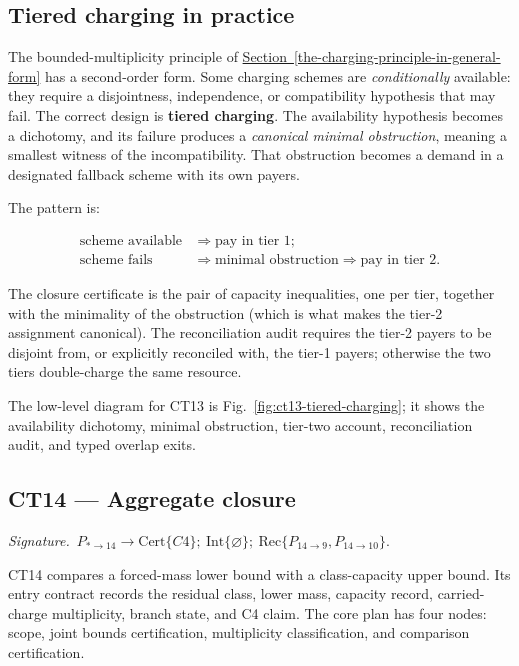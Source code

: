 \documentclass[
  11pt,
]{article}
\theoremstyle{definition}
\newcommand{\secref}[1]{\hyperref[#1]{Section~\ref*{#1}}}
\newcommand{\ctsignature}[1]{\par\noindent\emph{Signature.}\ #1\par\medskip}
\newcommand{\ctcert}[1]{\mathrm{Cert}\{#1\}}
\newcommand{\ctint}[1]{\mathrm{Int}\{#1\}}
\newcommand{\ctrec}[1]{\mathrm{Rec}\{#1\}}
\newcommand{\ctnone}{\varnothing}
\begin{document}
\FloatBarrier


\subsection*{Tiered charging in practice}

The bounded-multiplicity principle of \secref{the-charging-principle-in-general-form} has a second-order
form. Some charging schemes are \emph{conditionally} available: they
require a disjointness, independence, or compatibility hypothesis that
may fail. The correct design is \textbf{tiered charging}. The
availability hypothesis becomes a dichotomy, and its failure produces a
\emph{canonical minimal obstruction}, meaning a smallest witness of the
incompatibility. That obstruction becomes a demand in a designated
fallback scheme with its own payers.

The pattern is:

\[
\begin{aligned}
\text{scheme available} &\Rightarrow \text{pay in tier 1};\\
\text{scheme fails} &\Rightarrow \text{minimal obstruction} \Rightarrow \text{pay in tier 2}.
\end{aligned}
\]

The closure certificate is the pair of capacity inequalities, one per
tier, together with the minimality of the obstruction (which is what
makes the tier-2 assignment canonical). The reconciliation audit requires
the tier-2 payers to be disjoint from, or explicitly reconciled with, the
tier-1 payers; otherwise the two tiers double-charge the same resource.

The low-level diagram for CT13 is Fig.~\ref{fig:ct13-tiered-charging};
it shows the availability dichotomy, minimal obstruction, tier-two
account, reconciliation audit, and typed overlap exits.



\subsection{CT14 --- Aggregate closure}\label{ct:14}\label{aggregate-closure-mass-bounds-on-residual-classes}
\ctsignature{\(P_{\ast\to14}\to \ctcert{C4};\ \ctint{\ctnone};\ \ctrec{P_{14\to9},P_{14\to10}}.\)}

CT14 compares a forced-mass lower bound with a class-capacity upper bound.
Its entry contract records the residual class, lower mass, capacity record,
carried-charge multiplicity, branch state, and C4 claim.  The core plan has
four nodes: scope, joint bounds certification, multiplicity classification,
and comparison certification.
\end{document}
